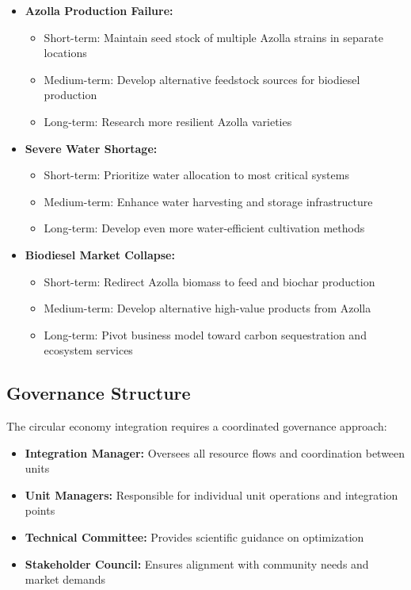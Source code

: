 \begin{itemize}
    \item \textbf{Azolla Production Failure:}
    \begin{itemize}
        \item Short-term: Maintain seed stock of multiple Azolla strains in separate locations
        \item Medium-term: Develop alternative feedstock sources for biodiesel production
        \item Long-term: Research more resilient Azolla varieties
    \end{itemize}
    
    \item \textbf{Severe Water Shortage:}
    \begin{itemize}
        \item Short-term: Prioritize water allocation to most critical systems
        \item Medium-term: Enhance water harvesting and storage infrastructure
        \item Long-term: Develop even more water-efficient cultivation methods
    \end{itemize}
    
    \item \textbf{Biodiesel Market Collapse:}
    \begin{itemize}
        \item Short-term: Redirect Azolla biomass to feed and biochar production
        \item Medium-term: Develop alternative high-value products from Azolla
        \item Long-term: Pivot business model toward carbon sequestration and ecosystem services
    \end{itemize}
\end{itemize}

\subsection{Governance Structure}

The circular economy integration requires a coordinated governance approach:

\begin{itemize}
    \item \textbf{Integration Manager:} Oversees all resource flows and coordination between units
    \item \textbf{Unit Managers:} Responsible for individual unit operations and integration points
    \item \textbf{Technical Committee:} Provides scientific guidance on optimization
    \item \textbf{Stakeholder Council:} Ensures alignment with community needs and market demands
\end{itemize}

